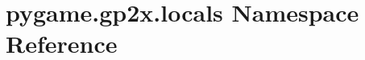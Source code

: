 \hypertarget{namespacepygame_1_1gp2x_1_1locals}{}\section{pygame.\+gp2x.\+locals Namespace Reference}
\label{namespacepygame_1_1gp2x_1_1locals}
